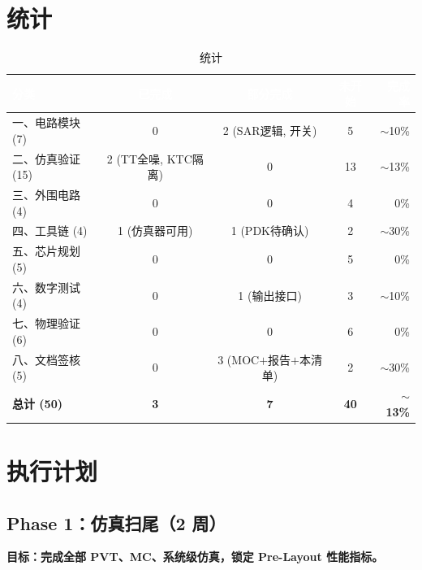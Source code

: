 \documentclass[12pt,a4paper,fontset=none]{ctexart}
\newcommand{\needtable}{\needspace{6cm}}   %
\begin{document}
\newpage
\needtable
\section{统计}

\begin{table}[H]
\centering
\caption{统计}
\begin{tabular}{@{}lcccr@{}}
\toprule
\rowcolor{tabhead}
\textcolor{white}{\textbf{分类}} &
\textcolor{white}{\textbf{已完成}} &
\textcolor{white}{\textbf{部分完成}} &
\textcolor{white}{\textbf{未开始}} &
\textcolor{white}{\textbf{完成率}} \\
\midrule
一、电路模块 (7) & 0 & 2 (SAR逻辑, 开关) & 5 & $\sim$10\% \\
二、仿真验证 (15) & 2 (TT全噪, KTC隔离) & 0 & 13 & $\sim$13\% \\
三、外围电路 (4) & 0 & 0 & 4 & 0\% \\
四、工具链 (4) & 1 (仿真器可用) & 1 (PDK待确认) & 2 & $\sim$30\% \\
五、芯片规划 (5) & 0 & 0 & 5 & 0\% \\
六、数字测试 (4) & 0 & 1 (输出接口) & 3 & $\sim$10\% \\
七、物理验证 (6) & 0 & 0 & 6 & 0\% \\
八、文档签核 (5) & 0 & 3 (MOC$+$报告$+$本清单) & 2 & $\sim$30\% \\
\midrule
\textbf{总计 (50)} & \textbf{3} & \textbf{7} & \textbf{40} & \textbf{$\sim$13\%} \\
\bottomrule
\end{tabular}
\end{table}

\newpage
\section{执行计划}

\needtable
\subsection{Phase 1：仿真扫尾（2 周）}

\textbf{目标：完成全部 PVT、MC、系统级仿真，锁定 Pre-Layout 性能指标。}
\end{document}
